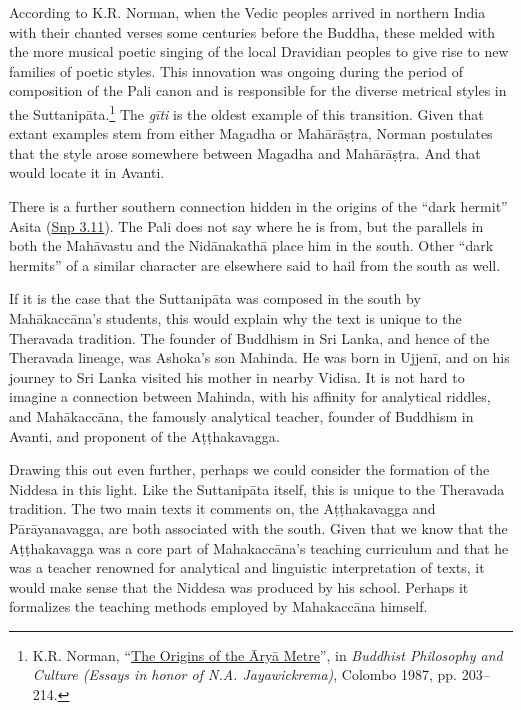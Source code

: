 \documentclass[12pt,openany]{book}%
\begin{document}
According to K.R. Norman, when the Vedic peoples arrived in northern India with their chanted verses some centuries before the Buddha, these melded with the more musical poetic singing of the local Dravidian peoples to give rise to new families of poetic styles. This innovation was ongoing during the period of composition of the Pali canon and is responsible for the diverse metrical styles in the \textsanskrit{Suttanipāta}.\footnote{K.R. Norman, “\href{https://www.ancient-buddhist-texts.net/Textual-Studies/Prosody-Articles/Norman-Arya.htm}{The Origins of the Āryā Metre}”, in \textit{Buddhist Philosophy and Culture (Essays in honor of N.A. Jayawickrema)}, Colombo 1987, pp. 203–214. } The \textit{\textsanskrit{gīti}} is the oldest example of this transition. Given that extant examples stem from either Magadha or \textsanskrit{Mahārāṣṭra}, Norman postulates that the style arose somewhere between Magadha and \textsanskrit{Mahārāṣṭra}. And that would locate it in Avanti.

There is a further southern connection hidden in the origins of the “dark hermit” Asita (\href{https://suttacentral.net/snp3.11/en/sujato}{Snp 3.11}). The Pali does not say where he is from, but the parallels in both the \textsanskrit{Mahāvastu} and the \textsanskrit{Nidānakathā} place him in the south. Other “dark hermits” of a similar character are elsewhere said to hail from the south as well.

If it is the case that the \textsanskrit{Suttanipāta} was composed in the south by \textsanskrit{Mahākaccāna}’s students, this would explain why the text is unique to the Theravada tradition. The founder of Buddhism in Sri Lanka, and hence of the Theravada lineage, was Ashoka’s son Mahinda. He was born in \textsanskrit{Ujjenī}, and on his journey to Sri Lanka visited his mother in nearby Vidisa. It is not hard to imagine a connection between Mahinda, with his affinity for analytical riddles, and \textsanskrit{Mahākaccāna}, the famously analytical teacher, founder of Buddhism in Avanti, and proponent of the \textsanskrit{Aṭṭhakavagga}.

Drawing this out even further, perhaps we could consider the formation of the Niddesa in this light. Like the \textsanskrit{Suttanipāta} itself, this is unique to the Theravada tradition. The two main texts it comments on, the \textsanskrit{Aṭṭhakavagga} and \textsanskrit{Pārāyanavagga}, are both associated with the south. Given that we know that the \textsanskrit{Aṭṭhakavagga} was a core part of \textsanskrit{Mahakaccāna}’s teaching curriculum and that he was a teacher renowned for analytical and linguistic interpretation of texts, it would make sense that the Niddesa was produced by his school. Perhaps it formalizes the teaching methods employed by \textsanskrit{Mahakaccāna} himself.
\end{document}
